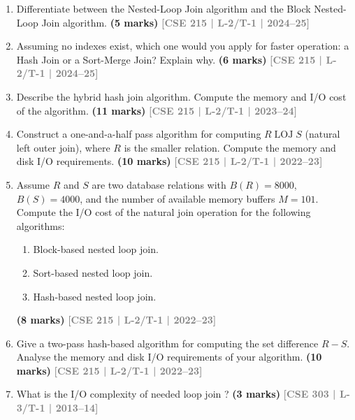 \documentclass[12pt,a3paper]{article}
\newcommand{\yr}[1]{\hfill\textcolor{gray}{\small\textbf{[#1]}}}
\newcommand{\mk}[1]{\textcolor{orange!70!black}{\small\textbf{(#1 marks)}}}
\begin{document}
\begin{enumerate}\item Differentiate between the Nested-Loop Join algorithm and the Block Nested-Loop Join algorithm.
\mk{5} \yr{CSE 215 | L-2/T-1 | 2024--25}

\item Assuming no indexes exist, which one would you apply for faster operation: a Hash Join or a Sort-Merge Join? Explain why.
\mk{6} \yr{CSE 215 | L-2/T-1 | 2024--25}

\item Describe the hybrid hash join algorithm. Compute the memory and I/O cost of the algorithm.
\mk{11} \yr{CSE 215 | L-2/T-1 | 2023--24}

\item Construct a one-and-a-half pass algorithm for computing $R \mathbin{\text{LOJ}} S$ (natural left outer join), where $R$ is the smaller relation. Compute the memory and disk I/O requirements.
\mk{10} \yr{CSE 215 | L-2/T-1 | 2022--23}

\item Assume $R$ and $S$ are two database relations with $B(R) = 8000$, $B(S) = 4000$, and the number of available memory buffers $M = 101$. Compute the I/O cost of the natural join operation for the following algorithms:
\begin{enumerate}
  \item Block-based nested loop join.
  \item Sort-based nested loop join.
  \item Hash-based nested loop join.
\end{enumerate}
\mk{8} \yr{CSE 215 | L-2/T-1 | 2022--23}

\item Give a two-pass hash-based algorithm for computing the set difference $R - S$. Analyse the memory and disk I/O requirements of your algorithm.
\mk{10} \yr{CSE 215 | L-2/T-1 | 2022--23}

\item What is the I/O complexity of needed loop join ?
\mk{3} \yr{CSE 303 | L-3/T-1 | 2013--14} 

\end{enumerate}
\end{document}
